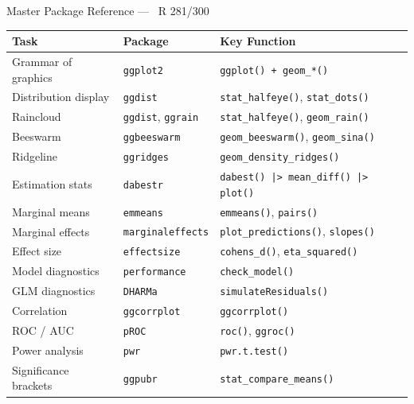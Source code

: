 \documentclass[10pt]{beamer}
\newcommand{\Rlang}{\textcolor{RAccent}{\faRProject~R}}
\newcommand{\smark}[1]{\hfill{\scriptsize\color{codegray}#1}}
\begin{document}
\begin{frame}{Master Package Reference --- \Rlang}
\smark{281/300}
\centering\scriptsize
\begin{tabular}{@{}lll@{}}
    \toprule
    \textbf{Task} & \textbf{Package} & \textbf{Key Function} \\
    \midrule
    Grammar of graphics  & \texttt{ggplot2}        & \texttt{ggplot() + geom\_*()} \\
    Distribution display & \texttt{ggdist}         & \texttt{stat\_halfeye()}, \texttt{stat\_dots()} \\
    Raincloud            & \texttt{ggdist}, \texttt{ggrain}& \texttt{stat\_halfeye()}, \texttt{geom\_rain()} \\
    Beeswarm             & \texttt{ggbeeswarm}     & \texttt{geom\_beeswarm()}, \texttt{geom\_sina()} \\
    Ridgeline            & \texttt{ggridges}       & \texttt{geom\_density\_ridges()} \\
    Estimation stats     & \texttt{dabestr}        & \texttt{dabest() |> mean\_diff() |> plot()} \\
    Marginal means       & \texttt{emmeans}        & \texttt{emmeans()}, \texttt{pairs()} \\
    Marginal effects     & \texttt{marginaleffects}& \texttt{plot\_predictions()}, \texttt{slopes()} \\
    Effect size          & \texttt{effectsize}     & \texttt{cohens\_d()}, \texttt{eta\_squared()} \\
    Model diagnostics    & \texttt{performance}    & \texttt{check\_model()} \\
    GLM diagnostics      & \texttt{DHARMa}         & \texttt{simulateResiduals()} \\
    Correlation          & \texttt{ggcorrplot}     & \texttt{ggcorrplot()} \\
    ROC / AUC            & \texttt{pROC}           & \texttt{roc()}, \texttt{ggroc()} \\
    Power analysis       & \texttt{pwr}            & \texttt{pwr.t.test()} \\
    Significance brackets& \texttt{ggpubr}         & \texttt{stat\_compare\_means()} \\
    \bottomrule
\end{tabular}
\end{frame}
\end{document}
